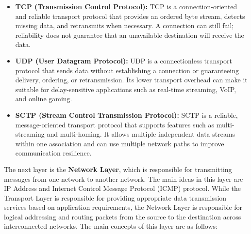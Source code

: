 \documentclass[journal]{IEEEtran}
\begin{document}
\begin{itemize}
    \item \textbf{TCP (Transmission Control Protocol):} TCP is a connection-oriented and reliable transport protocol that provides an ordered byte stream, detects missing data, and retransmits when necessary. A connection can still fail; reliability does not guarantee that an unavailable destination will receive the data.

    \item \textbf{UDP (User Datagram Protocol):} UDP is a connectionless transport protocol that sends data without establishing a connection or guaranteeing delivery, ordering, or retransmission. Its lower transport overhead can make it suitable for delay-sensitive applications such as real-time streaming, VoIP, and online gaming.

    \item \textbf{SCTP (Stream Control Transmission Protocol):} SCTP is a reliable, message-oriented transport protocol that supports features such as multi-streaming and multi-homing. It allows multiple independent data streams within one association and can use multiple network paths to improve communication resilience.
\end{itemize}


The next layer is the \textbf{Network Layer}, which is responsible for transmitting messages from one network to another network. The main ideas in this layer are IP Address and Internet Control Message Protocol (ICMP) protocol. While the Transport Layer is responsible for providing appropriate data transmission services based on application requirements, the Network Layer is responsible for logical addressing and routing packets from the source to the destination across interconnected networks. The main concepts of this layer are as follows:
\end{document}
